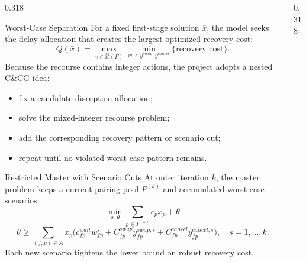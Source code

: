\documentclass[final]{beamer}
\newcommand{\tightitem}{\setlength{\itemsep}{0.10em}\setlength{\parsep}{0pt}\setlength{\topsep}{0pt}}
\newcommand{\eqsmall}[1]{\begingroup\scriptsize #1\endgroup}
\begin{document}
\begin{frame}[t]
\begin{minipage}[t]{0.968\textwidth}
\begin{columns}[t,totalwidth=\linewidth]
\begin{column}{0.318\linewidth}
\begin{exampleblock}{Worst-Case Separation}
For a fixed first-stage solution \(\bar{x}\), the model seeks the delay allocation that creates the largest optimized recovery cost:
\eqsmall{
\[
Q(\bar{x})=\max_{\gamma\in\widehat{\mathcal U}(\Gamma)}
\min_{w,z,y^{swap},y^{cancel}}\{\text{recovery cost}\}.
\]
}
Because the recourse contains integer actions, the project adopts a nested C\&CG idea:
\begin{itemize}\tightitem
  \item fix a candidate disruption allocation;
  \item solve the mixed-integer recourse problem;
  \item add the corresponding recovery pattern or scenario cut;
  \item repeat until no violated worst-case pattern remains.
\end{itemize}
\end{exampleblock}

\begin{alertblock}{Restricted Master with Scenario Cuts}
At outer iteration \(k\), the master problem keeps a current pairing pool \(P^{(k)}\) and accumulated worst-case scenarios:
\eqsmall{
\[
\min_{x,\theta}\sum_{p\in P^{(k)}}c_p x_p+\theta
\]
\[
\theta\geq
\sum_{(f,p)\in A}x_p
\big(c^{wait}_{fp}w^s_{fp}+C^{swap}_{fp}y^{swap,s}_{fp}
+C^{cancel}_{fp}y^{cancel,s}_{fp}\big),\quad s=1,\ldots,k.
\]
}
Each new scenario tightens the lower bound on robust recovery cost.
\end{alertblock}

\end{column}

\begin{column}{0.318\linewidth}


\end{column}
\end{columns}
\end{minipage}
\end{frame}
\end{document}
